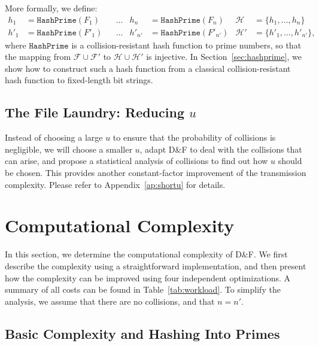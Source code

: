 \documentclass[twoside,envcountsame,runningheads]{llncs}
\newcommand{\Set}{\mathcal{H}}
\newcommand{\Files}{\mathcal{F}}
\newcommand{\df}{D\&F\xspace}
\newcommand{\HashPrime}{\ensuremath{\mathtt{HashPrime}}}
\newcommand{\apref}[1]{Appendix~\ref{#1}}
\newcommand{\apref}[1]{the full version~\cite{X:ABBMNR13}}
\begin{document}
More formally, we define:
\begin{align*}
h_1 &= \HashPrime(F_1) & &\dots & h_n &= \HashPrime(F_n) & \Set &= \{h_1,\dots,h_n\} \\
h'_1 &= \HashPrime(F'_1) & &\dots & h'_{n'} &= \HashPrime(F'_{n'}) & \Set' &= \{h'_1,\dots,h'_{n'}\},
\end{align*}
where $\HashPrime$ is a collision-resistant hash function to prime numbers, so that the mapping from $\Files \cup \Files'$ to $\Set \cup \Set'$ is injective.
In Section~\ref{sec:hashprime}, we show how to construct such a hash function from a classical collision-resistant hash function to fixed-length bit strings.

\subsection{The File Laundry: Reducing $u$}
\label{sec:shortu}

Instead of choosing a large $u$ to ensure that the probability of collisions is negligible, we will choose a smaller $u$, adapt \df to deal with the collisions that can arise, and propose a statistical analysis of collisions to find out how $u$ should be chosen.
This provides another constant-factor improvement of the transmission complexity. Please refer to \apref{ap:shortu} for details.

\section{Computational Complexity}
\label{sec:comp}
In this section, we determine the computational complexity of \df. We first describe the complexity using a straightforward implementation, and then present how the complexity can be improved using four independent optimizations. A summary of all costs can be found in Table~\ref{tab:workload}.
To simplify the analysis, we assume that there are no collisions, and that $n=n'$.


\subsection{Basic Complexity and Hashing Into Primes}
\label{sec:basiccomp}
\label{sec:hashprime}
\end{document}
